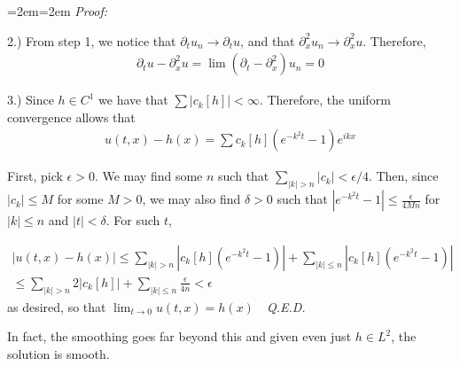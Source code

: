 \documentclass{article}
\newcommand{\pd}{\partial}
\newenvironment{pf}{%
	\par%
	\medskip
	\leftskip=2em\rightskip=2em%
	\noindent\ignorespaces \textit{Proof:} \newline}{%
	\,\, \newline \textit{Q.E.D.}\par\medskip}
\begin{document}
\begin{pf}
		
		2.) From step 1, we notice that $\pd_{t} u_{n} \to \pd_{t} u$, and that $\pd_{x}^{2} u_{n} \to \pd_{x}^{2}u$. Therefore, 
		\begin{align*}
			\pd_{t} u- \pd_{x}^{2} u = \lim (\pd_{t} - \pd_{x}^{2})u_{n} = 0
		\end{align*}
		
		3.) Since $h \in C^{1}$ we have that $\sum |c_{k}[h]| < \infty$. Therefore, the uniform convergence allows that 
		\begin{align*}
			u(t,x) - h(x) = \sum c_{k}[h] ( e^{-k^{2}t}-1)e^{ikx}
		\end{align*}
		
		First, pick $\epsilon > 0$. We may find some $n$ such that $\sum_{|k| > n} |c_{k}| < \epsilon/4$. Then, since $|c_{k}| \leq M$ for some $M > 0$, we may also find $\delta > 0$ such that $|e^{-k^{2}t}-1| \leq \frac{\epsilon}{4Mn}$ for $|k| \leq n$ and $|t| <\delta$. For such $t$,
		
		\begin{align*}
			|u(t,x) - h(x)| \leq \sum_{|k|>n} |c_{k}[h] ( e^{-k^{2}t}-1)| + \sum_{|k|\leq n} |c_{k}[h] ( e^{-k^{2}t}-1)| \\
			\leq \sum_{|k|>n} 2|c_{k}[h] | + \sum_{|k|\leq n} \frac{\epsilon}{4n} < \epsilon
		\end{align*} 
		as desired, so that $\lim_{t \to 0} u(t,x) = h(x)$
	\end{pf}
	
	In fact, the smoothing goes far beyond this and given even just $h \in L^{2}$, the solution is smooth.  
\end{document}
